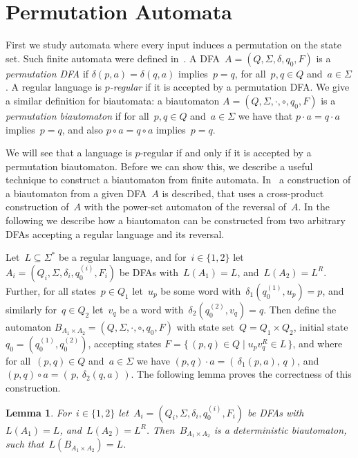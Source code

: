 \documentclass[submission]{eptcs}
\newcommand{\dfa}{\textrm{DFA}}
\newtheorem{lemma}[theorem]{Lemma}
\begin{document}
\section{Permutation Automata}
\label{sec:permutation-automata}

First we study automata where every input induces a permutation on the
state set.  Such finite automata were defined in~\cite{Th68a}.  A
\dfa\ $A=(Q,\Sigma,\delta,q_0,F)$ is a \emph{permutation \dfa} if
$\delta(p,a) = \delta(q,a)$ implies~$p=q$, for all~$p,q\in Q$
and~$a\in\Sigma$.  A regular language is \emph{$p$-regular} if it is
accepted by a permutation \dfa.
We give a similar definition for biautomata: a biautomaton
$A=(Q,\Sigma,\cdot,\circ,q_0,F)$ is a \emph{permutation biautomaton}
if for all~$p,q\in Q$ and~$a\in \Sigma$ we have that $p\cdot a =
q\cdot a$ implies~$p=q$, and also $p\circ a = q\circ a$ implies~$p=q$.

We will see that a language is $p$-regular if and only if it is
accepted by a permutation biautomaton.  Before we can show this, we
describe a useful technique to construct a biautomaton from finite
automata.
In~\cite{KlPo12} a construction of a biautomaton from a given \dfa~$A$
is described, that uses a cross-product construction of~$A$ with the
power-set automaton of the reversal of~$A$.
In the following we describe how a biautomaton can be constructed from
two arbitrary \dfa s accepting a regular language and its reversal.

Let~$L\subseteq\Sigma^*$ be a regular language, and for~$i\in\{1,2\}$
let~$A_i=(Q_i,\Sigma,\delta_i,q_0^{(i)},F_i)$ be \dfa s
with~$L(A_1)=L$, and~$L(A_2)=L^R$.  Further, for all states~$p\in Q_1$
let~$u_p$ be some word with~$\delta_1(q_0^{(1)},u_p)= p$, and
similarly for~$q\in Q_2$ let~$v_q$ be a word
with~$\delta_2(q_0^{(2)},v_q)= q$.
Then define the automaton $B_{A_1\times A_2} =
(Q,\Sigma,\cdot,\circ,q_0,F)$ with state set~$Q=Q_1\times Q_2$,
initial state~$q_0=(q_0^{(1)},q_0^{(2)})$, accepting states
$F=\{\,(p,q)\in Q \mid u_pv_q^R \in L\,\}$, and where for
all~$(p,q)\in Q$ and~$a\in \Sigma$ we have $(p,q)\cdot a =
(\,\delta_1(p,a),\,q\,)$, and $(p,q)\circ a =
(\,p,\,\delta_2(q,a)\,)$.  The following lemma proves the correctness
of this construction.

\begin{lemma}\label{lem:cross-product-dbia}
  For~$i\in\{1,2\}$ let~$A_i=(Q_i,\Sigma,\delta_i,q_0^{(i)},F_i)$ be
  \dfa s with~$L(A_1)=L$, and~$L(A_2)=L^R$.  Then~$B_{A_1\times A_2}$
  is a deterministic biautomaton, such that~$L(B_{A_1\times A_2}) =
  L$.
\end{lemma}
\end{document}
